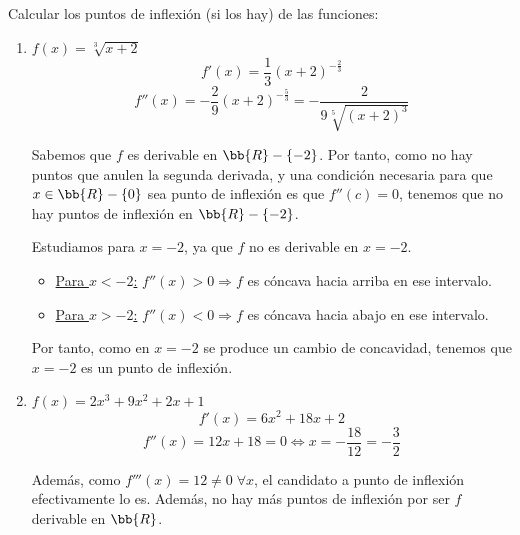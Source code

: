 \begin{ejercicio}
    Calcular los puntos de inflexión (si los hay) de las funciones:
    \begin{enumerate}
        \item $f(x)=\sqrt[3]{x+2}$
        \begin{equation*}
            f'(x) = \frac{1}{3}(x+2)^{-\frac{2}{3}}
        \end{equation*}
        \begin{equation*}
            f''(x) = -\frac{2}{9}(x+2)^{-\frac{5}{3}} = -\frac{2}{9\sqrt[5]{(x+2)^3}}
        \end{equation*}

        Sabemos que $f$ es derivable en $\bb{R}-\{-2\}$. Por tanto, como no hay puntos que anulen la segunda derivada, y una condición necesaria para que $x\in\bb{R}-\{0\}$ sea punto de inflexión es que $f''(c)=0$, tenemos que no hay puntos de inflexión en $\bb{R}-\{-2\}$.

        Estudiamos para $x=-2$, ya que $f$ no es derivable en $x=-2$.
        \begin{itemize}
            \item \underline{Para $x<-2$:} $f''(x)>0 \Longrightarrow f$ es cóncava hacia arriba en ese intervalo.
            \item \underline{Para $x>-2$:} $f''(x)<0 \Longrightarrow f$ es cóncava hacia abajo en ese intervalo.
        \end{itemize}
        Por tanto, como en $x=-2$ se produce un cambio de concavidad, tenemos que $x=-2$ es un punto de inflexión.
        
        \item $f(x)=2x^3 + 9x^2 + 2x + 1$
        \begin{equation*}
            f'(x) = 6x^2 + 18x + 2
        \end{equation*}
        \begin{equation*}
            f''(x) = 12x + 18 = 0 \Longleftrightarrow x=-\frac{18}{12} = -\frac{3}{2}
        \end{equation*}

        Además, como $f'''(x) = 12 \neq 0 \;\forall x$, el candidato a punto de inflexión efectivamente lo es. Además, no hay más puntos de inflexión por ser $f$ derivable en $\bb{R}$.
    \end{enumerate}
\end{ejercicio}


